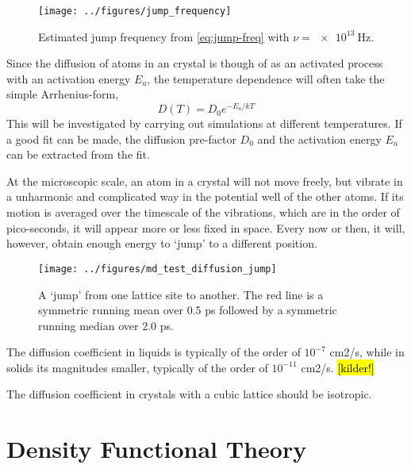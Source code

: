\documentclass[11pt,bibliography=totoc,index=totoc]{scrbook}   %
\newcommand{\comment}[1]{\hl{#1}}
\begin{document}
\begin{figure}[htbp]
  \begin{center}
    \texttt{[image: ../figures/jump\_frequency]}
  \end{center}
  \caption{Estimated jump frequency from \eqref{eq:jump-freq} with $\nu=\SI{e13}{\hertz}$.}
  \label{fig:../figures/jump_frequency}
\end{figure}



Since the diffusion of atoms in an crystal is though of as an activated process with an activation energy $E_a$, the temperature dependence will often take the simple Arrhenius-form,
\begin{equation}
  D(T) = D_0 e^{-E_a/kT}
\end{equation}
This will be investigated by carrying out simulations at different temperatures. 
If a good fit can be made, the diffusion pre-factor $D_0$ and the activation energy $E_a$ can be extracted from the fit.

At the microscopic scale, an atom in a crystal will not move freely, but vibrate in a unharmonic and complicated way in the potential well of the other atoms. 
If its motion is averaged over the timescale of the vibrations, which are in the order of pico-seconds, it will appear more or less fixed in space. 
Every now or then, it will, however, obtain enough energy to `jump' to a different position.

\begin{figure}[htbp]
  \begin{center}
    \texttt{[image: ../figures/md\_test\_diffusion\_jump]}
  \end{center}
  \caption{A `jump' from one lattice site to another. The red line is a symmetric running mean over 0.5 ps followed by a symmetric running median over 2.0 ps.}
  \label{fig:../figures/md_test_diffusion_jump}
\end{figure}

The diffusion coefficient in liquids is typically of the order of $10^{-7}$ cm2/s,
while in solids its magnitudes smaller, typically of the order of $10^{-11}$ cm2/s. \comment{[kilder!]}


The diffusion coefficient in crystals with a cubic lattice should be isotropic.

\chapter{Density Functional Theory}
\end{document}
